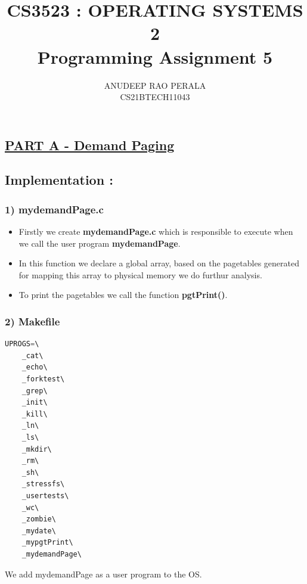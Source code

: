 \documentclass[12pt,a4paper]{article}
\title{CS3523 : OPERATING SYSTEMS 2 \\ Programming Assignment 5}
\author{ANUDEEP RAO PERALA \\ CS21BTECH11043 }
\date{}
\begin{document}
	\maketitle
	
	\newpage
	
	\subsection*{\underline{PART A - Demand Paging}}
	\subsection*{Implementation :}

	\subsubsection*{1) mydemandPage.c}
\begin{itemize}
	\item Firstly we create \textbf{mydemandPage.c} which is responsible to execute when we call the user program \textbf{mydemandPage}.
	\item In this function we declare a global array, based on the pagetables generated for mapping this array to physical memory we do furthur analysis.
	\item To print the pagetables we call the function \textbf{pgtPrint()}.
\end{itemize}
	\subsubsection*{2) Makefile}
									\begin{lstlisting}[language=C, style = mystyle]
	UPROGS=\
	_cat\
	_echo\
	_forktest\
	_grep\
	_init\
	_kill\
	_ln\
	_ls\
	_mkdir\
	_rm\
	_sh\
	_stressfs\
	_usertests\
	_wc\
	_zombie\
	_mydate\
	_mypgtPrint\
	_mydemandPage\
		\end{lstlisting}
	We add mydemandPage as a user program to the OS.
\end{document}

